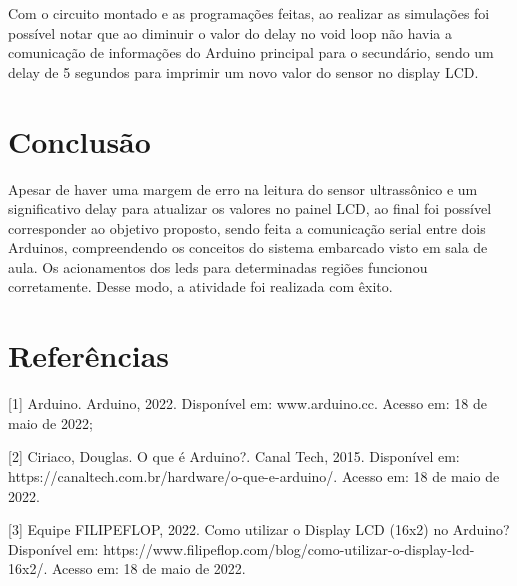 \documentclass[conference]{IEEEtran}
\begin{document}
Com o circuito montado e as programações feitas, ao realizar as simulações foi possível notar que ao diminuir o valor do delay no void loop não havia a comunicação de informações do Arduino principal para o secundário, sendo um delay de 5 segundos para imprimir um novo valor do sensor no display LCD. 


\section{Conclusão}
 Apesar de haver uma margem de erro na leitura do sensor ultrassônico e um significativo delay para atualizar os valores no painel LCD, ao final foi possível corresponder ao objetivo proposto, sendo feita a comunicação serial entre dois Arduinos, compreendendo os conceitos do sistema embarcado visto em sala de aula. Os acionamentos dos leds para determinadas regiões funcionou corretamente. Desse modo, a atividade foi realizada com êxito. 

\section *{Referências}
     [1] Arduino. Arduino, 2022. Disponível em: www.arduino.cc. Acesso em: 18 de maio de 2022;
    
     [2] Ciriaco, Douglas. O que é Arduino?. Canal Tech,
2015. Disponível em: https://canaltech.com.br/hardware/o-que-e-arduino/. Acesso em: 18 de maio de 2022.

     [3] Equipe FILIPEFLOP, 2022. Como utilizar o Display LCD (16x2) no Arduino?
Disponível em: https://www.filipeflop.com/blog/como-utilizar-o-display-lcd-16x2/. Acesso em: 18 de maio de 2022.
\end{document}

